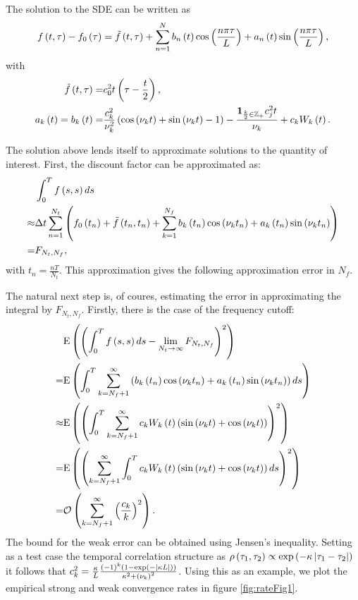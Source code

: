 \documentclass[11pt]{amsart}
\begin{document}
The solution to the SDE can be written as
\begin{align*}
f \left( {t,\tau} \right) - f_0 \left( {\tau} \right)
= \tilde f \left( {t,\tau} \right)
+ \displaystyle\sum\limits_{n=1}^{N} b_n \left( {t} \right) \cos \left( {\frac{n \pi \tau}{L}} \right) + a_n \left( {t} \right) \sin \left( {\frac{n \pi \tau}{L}} \right),
\end{align*}
with
\begin{align}
\tilde f \left( {t,\tau} \right) =& c_0^2 t \left( {\tau-\frac{t}{2}} \right),
\\
a_k \left( {t} \right) = b_k \left( {t} \right) =& \frac{c_k^2}{\nu_{k}^2}\left( {\cos \left( {\nu_{k} t} \right) + \sin \left( {\nu_{k} t} \right)-1 } \right) - \frac{\mathbf{1}_{\frac{k}{2} \in \mathbb Z_+}  c_j^2  t}{\nu_{k}}  + c_k W_k \left( {t} \right) .
\end{align}

The solution above lends itself to approximate solutions to the quantity of interest.
First, the discount factor can be approximated as:
\begin{align*}
&\int_0^{T} f \left( {s,s} \right) ds
\\
\approx& \Delta t \displaystyle\sum\limits_{n=1}^{N_t} \left( { f_0 \left( {t_n} \right) + \tilde f \left( {t_n, t_n} \right) +
\displaystyle\sum\limits_{k=1}^{N_f}
b_k \left( {t_n} \right) \cos \left( { \nu_{k} t_n} \right) + a_k \left( {t_n} \right) \sin \left( {\nu_{k} t_n} \right)
} \right)
\\
=& F_{N_t,N_f}
,
\end{align*}
with $t_n = \frac{nT}{N_t}$.
This approximation gives the following approximation error
in $N_f$.

The natural next step is, of coures, estimating the error in approximating the
integral by $F_{N_t,N_f}$. Firstly, there is the case of the frequency cutoff:
\begin{align*}
&\mathrm{E} \left( {{ \left( {\int_0^T f \left( {s,s} \right) ds - \lim_{N_t \rightarrow \infty} F_{N_t,N_f}} \right)^2}} \right)
\\
=& \mathrm{E} \left( {{\int_0^T \displaystyle\sum\limits_{k=N_f+1}^{\infty} \left( {b_k \left( {t_n} \right) \cos \left( {\nu_{k} t_n} \right) + a_k \left( {t_n} \right) \sin \left( {\nu_{k} t_n} \right)} \right) ds}} \right)
\\
\approx &
\mathrm{E} \left( {{\left( {\int_0^T \displaystyle\sum\limits_{k=N_f+1}^{\infty} c_k W_k \left( {t} \right) \left( {\sin \left( {\nu_{k} t} \right) + \cos \left( {\nu_{k} t} \right) } \right)} \right)^2}} \right)
\\
= &
\mathrm{E} \left( {{\left( { \displaystyle\sum\limits_{k=N_f+1}^{\infty} \int_0^T c_k W_k \left( {t} \right) \left( {\sin \left( {\nu_{k} t} \right) + \cos \left( {\nu_{k} t} \right) } \right) ds} \right)^2}} \right)
\\
= & \mathcal O \left( {{\displaystyle\sum\limits_{k=N_f+1}^{\infty} \left( {\frac{c_k}{k}} \right)^2}} \right).
\end{align*}
The bound for the weak error can be obtained using Jensen's inequality. Setting as a test
case the temporal correlation structure as
$
\rho \left( {\tau_1, \tau_2} \right) \propto \mathrm{exp}\left ( { - \kappa \left| {\tau_1-\tau_2} \right|}\right )
$
it follows that $c^2_k =\frac{\kappa}{L} \frac{\left( {-1} \right)^k\left( {1-\mathrm{exp}\left ( {-\left| {\kappa L} \right|}\right )} \right)}{\kappa^2 + \left( {\nu_{k}} \right)^2}$. Using this as an example, we plot the empirical strong and weak convergence rates in figure \ref{fig:rateFig1}.
\end{document}
